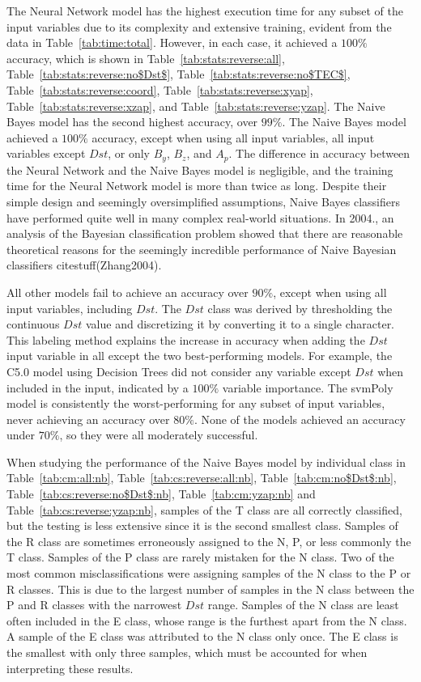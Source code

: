 \documentclass[preprint,12pt]{elsarticle}
\begin{document}
The Neural Network model has the highest execution time for any subset of the input variables due to its complexity and extensive training, evident from the data in Table~\ref{tab:time:total}. However, in each case, it achieved a $100\%$ accuracy, which is shown in Table~\ref{tab:stats:reverse:all}, Table~\ref{tab:stats:reverse:no$Dst$}, Table~\ref{tab:stats:reverse:no$TEC$}, Table~\ref{tab:stats:reverse:coord}, Table~\ref{tab:stats:reverse:xyap}, Table~\ref{tab:stats:reverse:xzap}, and Table~\ref{tab:stats:reverse:yzap}. The Naive Bayes model has the second highest accuracy, over $99\%$. The Naive Bayes model achieved a $100\%$ accuracy, except when using all input variables, all input variables except $Dst$, or only $B_{y}$, $B_{z}$, and $A_{p}$. The difference in accuracy between the Neural Network and the Naive Bayes model is negligible, and the training time for the Neural Network model is more than twice as long. Despite their simple design and seemingly oversimplified assumptions, Naive Bayes classifiers have performed quite well in many complex real-world situations. In 2004., an analysis of the Bayesian classification problem showed that there are reasonable theoretical reasons for the seemingly incredible performance of Naive Bayesian classifiers citestuff(Zhang2004).

All other models fail to achieve an accuracy over $90\%$, except when using all input variables, including $Dst$. The $Dst$ class was derived by thresholding the continuous $Dst$ value and discretizing it by converting it to a single character. This labeling method explains the increase in accuracy when adding the $Dst$ input variable in all except the two best-performing models. For example, the C5.0 model using Decision Trees did not consider any variable except $Dst$ when included in the input, indicated by a $100\%$ variable importance. The svmPoly model is consistently the worst-performing for any subset of input variables, never achieving an accuracy over $80\%$. None of the models achieved an accuracy under $70\%$, so they were all moderately successful.

When studying the performance of the Naive Bayes model by individual class in Table~\ref{tab:cm:all:nb}, Table~\ref{tab:cs:reverse:all:nb}, Table~\ref{tab:cm:no$Dst$:nb}, Table~\ref{tab:cs:reverse:no$Dst$:nb}, Table~\ref{tab:cm:yzap:nb} and Table~\ref{tab:cs:reverse:yzap:nb}, samples of the T class are all correctly classified, but the testing is less extensive since it is the second smallest class. Samples of the R class are sometimes erroneously assigned to the N, P, or less commonly the T class. Samples of the P class are rarely mistaken for the N class. Two of the most common misclassifications were assigning samples of the N class to the P or R classes. This is due to the largest number of samples in the N class between the P and R classes with the narrowest $Dst$ range. Samples of the N class are least often included in the E class, whose range is the furthest apart from the N class. A sample of the E class was attributed to the N class only once. The E class is the smallest with only three samples, which must be accounted for when interpreting these results.
\end{document}
